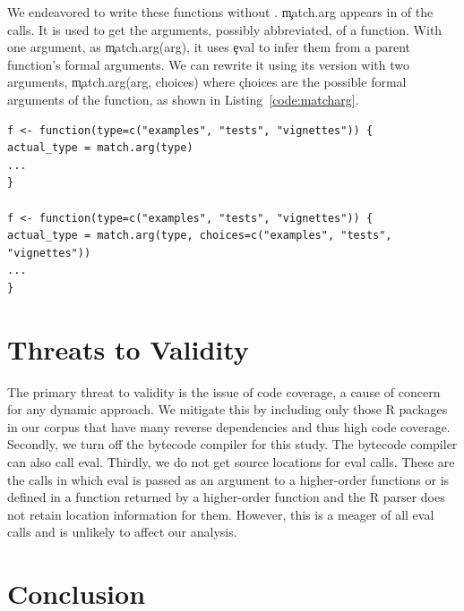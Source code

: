 \documentclass[conference]{IEEEtran}
\begin{document}
We endeavored  to write these functions without \eval. \c{match.arg} appears in \MatchArgPercent of the \eval calls. It is used to get the arguments, possibly abbreviated, of a function. With one argument, as \c{match.arg(arg)}, it uses \c{eval} to infer them from a parent function's formal arguments. We can rewrite it using its version with two arguments, \c{match.arg(arg, choices)} where \c{choices} are the possible formal arguments of the function, as shown in Listing~\ref{code:matcharg}.

\begin{lstlisting}[caption={Rewriting \c{match.arg} without \eval}, label=code:matcharg]
f <- function(type=c("examples", "tests", "vignettes")) {
actual_type = match.arg(type)
...
}

f <- function(type=c("examples", "tests", "vignettes")) {
actual_type = match.arg(type, choices=c("examples", "tests", "vignettes"))
...
}
\end{lstlisting}

\section{Threats to Validity}
The primary threat to validity is the issue of code coverage, a cause of concern
for any dynamic approach. We mitigate this by including only those R packages in
our corpus that have many reverse dependencies and thus high code coverage.
Secondly, we turn off the bytecode compiler for this study. The bytecode
compiler can also call eval. Thirdly, we do not get source locations for
\UndefinedEvalsRnd eval calls. These are the calls in which eval is passed as an
argument to a higher-order functions or is defined in a function returned by a higher-order function and the R parser does not retain location
information for them. However, this is a meager \PercentUndefinedEval of all eval
calls and is unlikely to affect our analysis.

\section{Conclusion}



\end{document}
